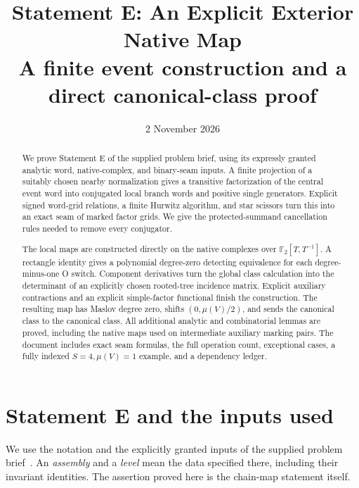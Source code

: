 \documentclass[11pt,a4paper]{article}
\title{Statement E: An Explicit Exterior Native Map\\[6pt]
\large A finite event construction and a direct canonical-class proof}
\author{}
\date{2 November 2026}
\theoremstyle{remark}
\begin{document}
\maketitle
\begin{abstract}
We prove Statement E of the supplied problem brief, using its expressly
granted analytic word, native-complex, and binary-seam inputs.  A finite
projection of a suitably chosen nearby normalization gives a transitive
factorization of the central event word into conjugated local branch
words and positive single generators.  Explicit signed word-grid
relations, a finite Hurwitz algorithm, and star scissors turn this into
an exact seam of marked factor grids.  We give the protected-summand
cancellation rules needed to remove every conjugator.

The local maps are constructed directly on the native complexes over
$\mathbb F_2[T,T^{-1}]$.  A rectangle identity gives a polynomial
degree-zero detecting equivalence for each degree-minus-one O switch.
Component derivatives turn the global class calculation into the
determinant of an explicitly chosen rooted-tree incidence matrix.
Explicit auxiliary contractions and an explicit simple-factor
functional finish the construction.  The resulting map has Maslov
degree zero, shifts $(0,\mu(V)/2)$, and sends the canonical class to
the canonical class.  All additional analytic and combinatorial
lemmas are proved, including the native maps used on intermediate
auxiliary marking pairs.  The document includes exact seam formulas,
the full operation count, exceptional cases, a fully indexed
$S=4,\mu(V)=1$ example, and a dependency ledger.
\end{abstract}
\begingroup
\small
\setlength{\parskip}{0pt}
\tableofcontents
\endgroup
\newpage


\section{Statement E and the inputs used}
\label{sec:statement}

We use the notation and the explicitly granted inputs of the supplied
problem brief~\cite{brief}.  An \emph{assembly} and a \emph{level} mean
the data specified there, including their invariant identities.  The
assertion proved here is the chain-map statement itself.
\end{document}
